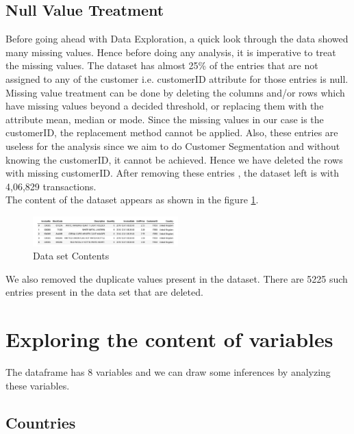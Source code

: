 \subsection{Null Value Treatment}
Before going ahead with Data Exploration, a quick look through the data showed many missing values. Hence before doing any analysis, it is imperative to treat the missing values. The dataset has almost 25\% of the entries that are not assigned to any of the customer i.e. customerID attribute for those entries is null. \\
Missing value treatment can be done by deleting the columns and/or rows which have missing values beyond a decided threshold, or replacing them with the attribute mean, median or mode. 
Since the missing values in our case is the customerID, the replacement method cannot be applied. Also, these entries are useless for the analysis since we aim to do Customer Segmentation and without knowing the customerID, it cannot be achieved. Hence we have deleted the rows with missing customerID. After removing these entries , the dataset left is with 4,06,829 transactions.\\

The content of the dataset appears as shown in the figure \ref{data}.

\begin{figure}[H]
\caption{Data set Contents}
\label{data}
\centering
\includegraphics[width=0.5\textwidth]{images/DatasetContent.PNG}
\end{figure}

We also removed the duplicate values present in the dataset. There are 5225 such entries present in the data set that are deleted.\\

\section*{Exploring the content of variables}

The dataframe has 8 variables and we can draw some inferences by analyzing these variables.

\subsection{Countries}

